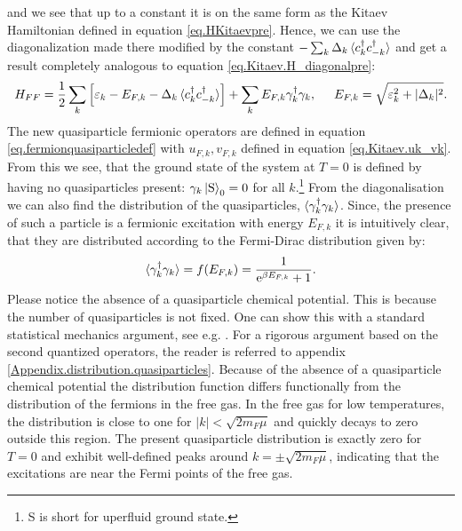 and we see that up to a constant it is on the same form as the Kitaev Hamiltonian defined in equation \eqref{eq.HKitaevpre}. Hence, we can use the diagonalization made there modified by the constant $-\sum_k \Delta_k\braket {c^\dagger_k c^\dagger_{-k}} $ and get a result completely analogous to equation \eqref{eq.Kitaev.H_diagonalpre}: 
\begin{equation}
H_{FF} = \frac{1}{2}\sum_k \left[\varepsilon_k-E_{F,k}-\Delta_k\braket {c^\dagger_k c^\dagger_{-k}}\right] + \sum_k E_{F,k} \gamma^\dagger_k \gamma_k, \hspace{0.5cm} E_{F,k} = \sqrt{\varepsilon_k^2 + |\Delta_k|^2}.
\label{eq.Kitaev.HFF_diagonal}
\end{equation}
The new quasiparticle fermionic operators are defined in equation \eqref{eq.fermionquasiparticledef} with $u_{F,k},v_{F,k}$ defined in equation \eqref{eq.Kitaev.uk_vk}. From this we see, that the ground state of the system at $T = 0$ is defined by having no quasiparticles present: $\gamma_k \ket{\text{S}}_0 = 0$ for all $k$.\footnote{S is short for uperfluid ground state.} From the diagonalisation we can also find the distribution of the quasiparticles, $\braket{\gamma^\dagger_k\gamma_k}$. Since, the presence of such a particle is a fermionic excitation with energy $E_{F,k}$ it is intuitively clear, that they are distributed according to the Fermi-Dirac distribution given by:
\begin{equation}
\braket{\gamma^\dagger_k \gamma_k} = f(E_{F,k}) = \frac{1}{\text{e}^{\beta E_{F,k}} + 1}. 
\label{eq.Distribution.quasiparticles}
\end{equation}
Please notice the absence of a quasiparticle chemical potential. This is because the number of quasiparticles is not fixed. One can show this with a standard statistical mechanics argument, see e.g. \cite[p. 225]{SchroederThermal}. For a rigorous argument based on the second quantized operators, the reader is referred to appendix \ref{Appendix.distribution.quasiparticles}. Because of the absence of a quasiparticle chemical potential the distribution function differs functionally from the distribution of the fermions in the free gas. In the free gas for low temperatures, the distribution is close to one for $|k|< \sqrt{2m_F\mu}$ and quickly decays to zero outside this region. The present quasiparticle distribution is exactly zero for $T = 0$ and exhibit well-defined peaks around $k = \pm \sqrt{2m_F\mu}$, indicating that the excitations are near the Fermi points of the free gas. 

